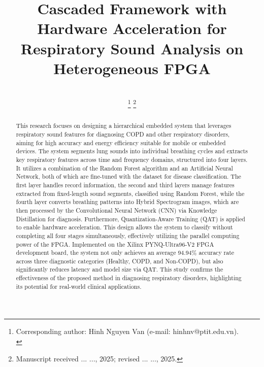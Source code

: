 \documentclass[lettersize,journal]{IEEEtran}
\begin{document}
\title{Cascaded Framework with Hardware Acceleration for Respiratory Sound Analysis on Heterogeneous FPGA}

\author{%
\\
%
\thanks{Corresponding author: Hinh Nguyen Van (e-mail: hinhnv@ptit.edu.vn).\protect\\}%
\thanks{Manuscript received ... ..., 2025; revised ... ..., 2025.}}

\maketitle

\begin{abstract}
This research focuses on designing a hierarchical embedded system that leverages respiratory sound features for diagnosing COPD and other respiratory disorders, aiming for high accuracy and energy efficiency suitable for mobile or embedded devices. The system segments lung sounds into individual breathing cycles and extracts key respiratory features across time and frequency domains, structured into four layers. It utilizes a combination of the Random Forest algorithm and an Artificial Neural Network, both of which are fine-tuned with the dataset for disease classification. The first layer handles record information, the second and third layers manage features extracted from fixed-length sound segments, classified using Random Forest, while the fourth layer converts breathing patterns into Hybrid Spectrogram images, which are then processed by the Convolutional Neural Network (CNN) via Knowledge Distillation for diagnosis. Furthermore, Quantization-Aware Training (QAT) is applied to enable hardware acceleration. This design allows the system to classify without completing all four stages simultaneously, effectively utilizing the parallel computing power of the FPGA. Implemented on the Xilinx PYNQ-Ultra96-V2 FPGA development board, the system not only achieves an average 94.94\% accuracy rate across three diagnostic categories (Healthy, COPD, and Non-COPD), but also significantly reduces latency and model size via QAT. This study confirms the effectiveness of the proposed method in diagnosing respiratory disorders, highlighting its potential for real-world clinical applications.
\end{abstract}
\end{document}
